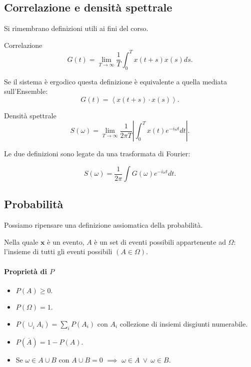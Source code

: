 \subsection{Correlazione e densità spettrale}%
\label{sub:Correlazione e densità spettrale}
Si rimembrano definizioni utili ai fini del corso. 
\begin{bluebox}{Correlazione}
    \[
        G\left(t\right)=\lim_{T \to \infty} \frac{1}{T}\int_{0}^{T} x\left(t+s\right) x\left(s\right)ds
    .\] 
\end{bluebox}
\noindent
Se il sistema è ergodico questa definizione è equivalente a quella mediata sull'Ensemble:
\[
    G( t) = \left<x(t+s) \cdot  x(s)\right>
.\] 
\begin{bluebox}{Densità spettrale}
    \[
        S\left(\omega\right) = \lim_{T \to \infty} \frac{1}{2\pi T}\left|\int_{0}^{T} x\left(t\right)e^{-i\omega t}dt \right|
    .\] 
\end{bluebox}
\noindent
Le due definizioni sono legate da una trasformata di Fourier: 
\begin{bluebox}{}
    \[
        S\left(\omega\right) = \frac{1}{2\pi}\int G\left(\omega\right)e^{-i\omega t}dt
    .\] 
\end{bluebox}



\subsection{Probabilità}%
\label{sub:Probabilità}
Possiamo ripensare una definizione assiomatica della probabilità.

Nella quale $\boldsymbol{x}$ è un evento, $A$ è un set di eventi possibili appartenente ad $\Omega$: l'insieme di tutti gli eventi possibili $(A \in \Omega)$.
\paragraph{Proprietà di $P$ }%
\label{par:Proprietà di P}
\begin{itemize}
    \item $P\left(A\right)\ge 0$.
    \item $P\left(\Omega\right) = 1$.
    \item $P\left(\cup_{i}^{} A_i \right) = \sum_{i}^{} P\left(A_i\right)$ con $A_i$ collezione di insiemi disgiunti numerabile.
    \item $P\left(\overline{A}\right) = 1- P\left(A\right)$.
    \item Se $\omega \in A \cup B$ con $A \cup B = 0$ $\implies$ $\omega\in A \ \lor \ \omega  \in B$.
\end{itemize}
